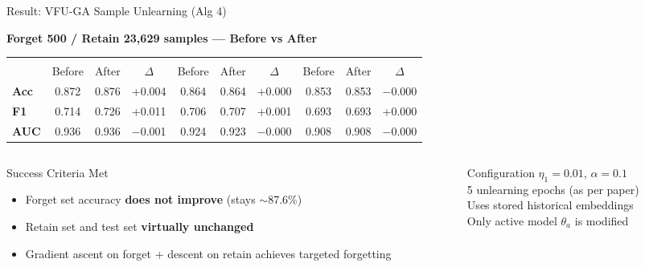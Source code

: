 \documentclass[aspectratio=169, 11pt]{beamer}
\begin{document}
\begin{frame}{Result: VFU-GA Sample Unlearning (Alg 4)}
  \begin{center}
    \textbf{Forget 500 / Retain 23,629 samples --- Before vs After}\\[0.3cm]
    \renewcommand{\arraystretch}{1.3}
    \begin{tabular}{>{\bfseries\footnotesize}l *{3}{>{\footnotesize}c} | *{3}{>{\footnotesize}c} | *{3}{>{\footnotesize}c}}
      \toprule
      & \multicolumn{3}{c|}{\textbf{Forget Set}} & \multicolumn{3}{c|}{\textbf{Retain Set}} & \multicolumn{3}{c}{\textbf{Test Set}} \\
      \cmidrule(lr){2-4} \cmidrule(lr){5-7} \cmidrule(lr){8-10}
      & Before & After & $\Delta$ & Before & After & $\Delta$ & Before & After & $\Delta$ \\
      \midrule
      Acc & 0.872 & 0.876 & \textcolor{softgreen}{+0.004} & 0.864 & 0.864 & \textcolor{softgreen}{+0.000} & 0.853 & 0.853 & $-$0.000 \\
      F1  & 0.714 & 0.726 & \textcolor{softgreen}{+0.011} & 0.706 & 0.707 & \textcolor{softgreen}{+0.001} & 0.693 & 0.693 & +0.000 \\
      AUC & 0.936 & 0.936 & $-$0.001 & 0.924 & 0.923 & $-$0.000 & 0.908 & 0.908 & $-$0.000 \\
      \bottomrule
    \end{tabular}
  \end{center}
  \vspace{0.3cm}
  \begin{columns}[T]
    \begin{column}{0.48\textwidth}
      \begin{exampleblock}{Success Criteria Met}
        \footnotesize
        \begin{itemize}
          \item Forget set accuracy \textbf{does not improve} (stays $\sim$87.6\%)
          \item Retain set and test set \textbf{virtually unchanged}
          \item Gradient ascent on forget + descent on retain achieves targeted forgetting
        \end{itemize}
      \end{exampleblock}
    \end{column}
    \begin{column}{0.48\textwidth}
      \begin{block}{Configuration}
        \footnotesize
        $\eta_1 = 0.01$, $\alpha = 0.1$\\
        5 unlearning epochs (as per paper)\\
        Uses stored historical embeddings\\
        Only active model $\theta_a$ is modified
      \end{block}
    \end{column}
  \end{columns}
\end{frame}
\end{document}
